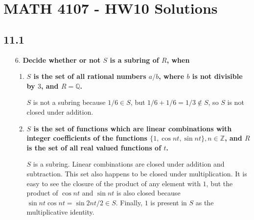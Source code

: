 \documentclass[a4paper,12pt]{article}
\begin{document}
\section*{MATH 4107 - HW10 Solutions}

\subsection*{11.1}
\begin{enumerate}
    \item[6.]
        \boldmath
        \textbf{Decide whether or not $S$ is a subring of $R$, when} \par
        \unboldmath
        \begin{enumerate}
            \item
                \boldmath
                \textbf{$S$ is the set of all rational numbers $a/b$, where $b$ is not divisible by $3$, and $R = \mathbb{Q}$.} \par
                \unboldmath
                $S$ is not a subring because $1/6 \in S$, but $1/6 + 1/6 = 1/3 \notin S$, so $S$ is not closed under addition.

            \item
                \boldmath
                \textbf{$S$ is the set of functions which are linear combinations with integer coefficients of the functions $\{ 1, \cos nt, \sin nt \}, n \in \mathbb{Z}$, and $R$ is the set of all real valued functions of $t$.} \par
                \unboldmath
                $S$ is a subring. Linear combinations are closed under addition and subtraction. This set also happens to be closed under multiplication. It is easy to see the closure of the product of any element with $1$, but the product of $\cos{nt}$ and $\sin{nt}$ is also closed because $\sin{nt}\cos{nt} = \sin{2nt}/2 \in S$. Finally, $1$ is present in $S$ as the multiplicative identity.
        \end{enumerate}


\end{enumerate}
\end{document}
